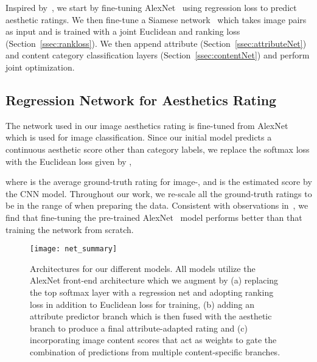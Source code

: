 \documentclass[runningheads]{llncs}
\begin{document}
Inspired by~\cite{simonyan2014very,xin2015iccv},
we start by fine-tuning AlexNet~\cite{krizhevsky2012imagenet} using regression loss to predict aesthetic ratings.
We then fine-tune a Siamese network~\cite{chopra2005learning} which takes image pairs as input and is
trained with a joint Euclidean and ranking loss (Section~\ref{ssec:rankloss}).
We then append attribute (Section~\ref{ssec:attributeNet})
and content category classification layers (Section~\ref{ssec:contentNet})
and perform joint optimization.



\subsection{Regression Network for Aesthetics Rating}
\label{ssec:regNet}
The network used in our image aesthetics rating is fine-tuned from AlexNet~\cite{krizhevsky2012imagenet} which is used for image classification.
Since our initial model predicts a continuous aesthetic score other than category labels,
we replace the softmax loss with the Euclidean loss given by
,
\begin{comment}
the following expression:

\end{comment}
where  is the average ground-truth rating for image-,
and   is the estimated score by the CNN model.
Throughout our work, we re-scale all the ground-truth ratings to be in the
range of  when preparing the data.
Consistent with observations in~\cite{xin2015iccv}, we find that fine-tuning
the pre-trained AlexNet~\cite{krizhevsky2012imagenet} model
performs better than that training the network from scratch.

\begin{figure}[t]
\centering
\texttt{[image: net\_summary]}
\caption{Architectures for our different models. All models utilize the
   AlexNet front-end architecture which we augment by (a) replacing the top
   softmax layer with a regression net and adopting ranking loss in addition to
   Euclidean loss for training, (b) adding an attribute predictor branch which
   is then fused with the aesthetic branch to produce a final attribute-adapted
   rating and (c) incorporating image content scores that act as weights to
   gate the combination of predictions from multiple content-specific branches.}
\vspace{-2mm}
\label{fig:net_summary}
\end{figure}
\end{document}
